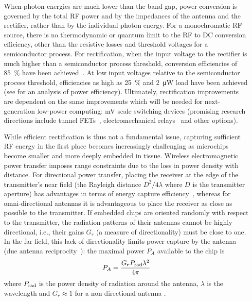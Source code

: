 When photon energies  are much lower than the band gap, power conversion is governed by the total RF power and by the impedances of the antenna and the rectifier, rather than by the individual photon energy.
For a monochromatic RF source, there is no thermodynamic or quantum limit to the RF to DC conversion efficiency, other than the resistive losses and threshold voltages for a semiconductor process.
For rectification, when the input voltage to the rectifier is much higher than a semiconductor process threshold, conversion efficiencies of \SI{85}{\percent} have been achieved~\cite{sun02}.
At low input voltages relative to the semiconductor process threshold, efficiencies as high as \SI{25}{\percent} and \SI{2}{\micro\watt} load have been achieved (see \cite{mandal07} for an analysis of power efficiency).
Ultimately, rectification improvements are dependent on the same improvements which will be needed for next-generation low-power computing: \si{\milli\volt} scale switching devices (promising research directions include tunnel FETs~\cite{ionescu11}, electromechanical relays~\cite{liu12} and other options). 

While efficient rectification is thus not a fundamental issue, capturing sufficient RF energy in the first place becomes increasingly challenging as microchips become smaller and more deeply embedded in tissue. Wireless electromagnetic power transfer imposes range constraints due to the loss in power density with distance.
For directional power transfer, placing the receiver at the edge of the transmitter's near field (the Rayleigh distance $D^2/4\lambda$ where $D$ is the transmitter aperture) has advantages in terms of energy capture efficiency~\cite{ozeri10}, whereas for omni-directional antennas it is advantageous to place the receiver as close as possible to the transmitter. If embedded chips are oriented randomly with respect to the transmitter, the radiation patterns of their antennas cannot be highly directional, i.e., their gains $G_r$ (a measure of directionality) must be close to one. In the far field, this lack of directionality limits power capture by the antenna (due antenna reciprocity~\cite{gershenfeld2000physics}): the maximal power $P_A$ available to the chip is \[P_A = \frac{G_r P_{\text{\scriptsize rad}} \lambda^2}{4\pi}\] where $P_{\text{\scriptsize rad}}$ is the power density of radiation around the antenna, $\lambda$ is the wavelength and $G_r \approx 1$ for a non-directional antenna \cite{mandal07}.

